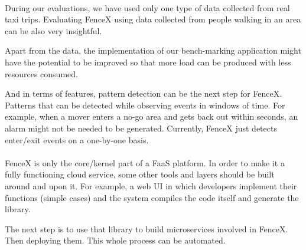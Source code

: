 \documentclass[a4]{report}
\begin{document}
    \paragraph{}
    During our evaluations, we have used only one type of data collected from real taxi trips.
    Evaluating FenceX using data collected from people walking in an area can be also very insightful.

    Apart from the data, the implementation of our bench-marking application might have the potential to be improved so
    that more load can be produced with less resources consumed.

    And in terms of features, pattern detection can be the next step for FenceX.
    Patterns that can be detected while observing events in windows of time.
    For example, when a mover enters a no-go area and gets back out within seconds, an alarm might not be needed to be generated.
    Currently, FenceX just detects enter/exit events on a one-by-one basis.

    \paragraph{}
    FenceX is only the core/kernel part of a FaaS platform.
    In order to make it a fully functioning cloud service, some other tools and layers should be built around and upon it.
    For example, a web UI in which developers implement their functions (simple cases) and the system compiles
    the code itself and generate the library.

    The next step is to use that library to build microservices involved in FenceX.
    Then deploying them.
    This whole process can be automated.

    \nocite{*}
    
    
\end{document}
